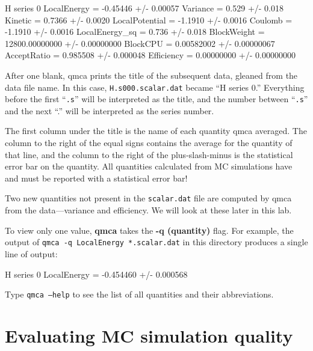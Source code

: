 \begin{shade}

H  series 0 
LocalEnergy           =          -0.45446 +/-          0.00057
Variance              =             0.529 +/-            0.018 
Kinetic               =            0.7366 +/-           0.0020
LocalPotential        =           -1.1910 +/-           0.0016
Coulomb               =           -1.1910 +/-           0.0016 
LocalEnergy_sq        =             0.736 +/-            0.018
BlockWeight           =    12800.00000000 +/-       0.00000000
BlockCPU              =        0.00582002 +/-       0.00000067 
AcceptRatio           =          0.985508 +/-         0.000048
Efficiency            =        0.00000000 +/-       0.00000000 
\end{shade}

After one blank, qmca prints the title of the subsequent data, gleaned from the
data file name.  In this case, \texttt{H.s000.scalar.dat} became ``H  series 0.''
Everything before the first ``\texttt{.s}'' will be interpreted as the title, and the
number between ``\texttt{.s}'' and the next ``.'' will be interpreted as the series
number. 

The first column under the title is the name of each quantity qmca averaged.
The column to the right of the equal signs contains the average for the
quantity of that line, and the column to the right of the plus-slash-minus is
the statistical error bar on the quantity.  All quantities calculated from MC
simulations have and must be reported with a statistical error bar!

Two new quantities not present in the \texttt{scalar.dat} file are computed by qmca from
the data---variance and efficiency.  We will look at these later in this lab. 

To view only one value, \textbf{qmca} takes the \textbf{-q (quantity)} flag.
For example, the output of \texttt{qmca -q LocalEnergy *.scalar.dat} in this
directory produces a single line of output:

\begin{shade} 
H  series 0  LocalEnergy = -0.454460 +/- 0.000568 
\end{shade}

Type \texttt{qmca --help} to see the list of all quantities and their
abbreviations.

\section{Evaluating MC simulation quality}

